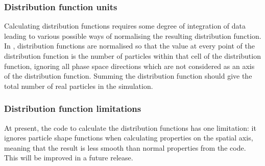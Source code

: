\documentclass[12pt,a4paper]{article}
\newcommand{\EPOCH}{{\color{warwickdark}\fontfamily{phv}\selectfont{EPOCH}}}
\begin{document}
\subsubsection{Distribution function units}
Calculating distribution functions requires some degree of integration of data
leading to various possible ways of normalising the resulting distribution
function. In {\EPOCH}, distribution functions are normalised so that the value
at every point of the distribution function is the number of particles within
that cell of the distribution function, ignoring all phase space directions
which are not considered as an axis of the distribution function. Summing the
distribution function should give the total number of real particles in the
simulation.

\subsubsection{Distribution function limitations}
At present, the code to calculate the distribution functions has one
limitation: it ignores particle shape functions when calculating properties
on the spatial axis, meaning that the result is less smooth than normal
properties from the code. This will be improved in a future release.
\end{document}
